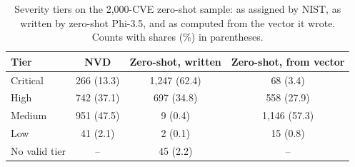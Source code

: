 \begin{table}[t]
\centering
\caption{Severity tiers on the 2{,}000-CVE zero-shot sample: as assigned by NIST, as written by zero-shot Phi-3.5, and as computed from the vector it wrote. Counts with shares (\%) in parentheses.}
\label{tab:zssev}
\small
\begin{tabular}{lccc}
\toprule
Tier & NVD & Zero-shot, written & Zero-shot, from vector \\
\midrule
Critical & 266 (13.3) & 1{,}247 (62.4) & 68 (3.4) \\
High & 742 (37.1) & 697 (34.8) & 558 (27.9) \\
Medium & 951 (47.5) & 9 (0.4) & 1{,}146 (57.3) \\
Low & 41 (2.1) & 2 (0.1) & 15 (0.8) \\
No valid tier & -- & 45 (2.2) & -- \\
\bottomrule
\end{tabular}
\end{table}
